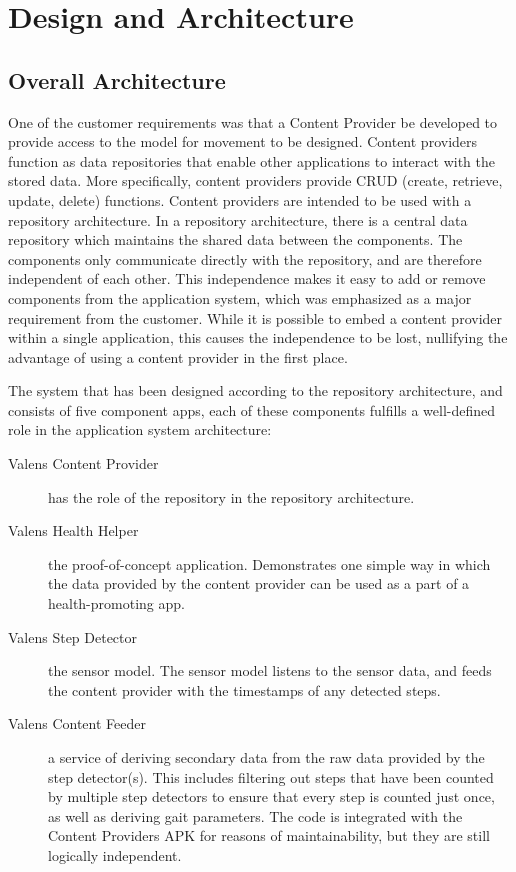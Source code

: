 \chapter{Design and Architecture}


\section{Overall Architecture}
\label{def:CProvider}
One of the customer requirements was that a Content Provider be developed to provide access to the model for movement to be designed. Content providers function as data repositories that enable other applications to interact with the stored data. More specifically, content providers provide CRUD (create, retrieve, update, delete) functions. Content providers are intended to be used with a repository architecture. In a repository architecture, there is a central data repository which maintains the shared data between the components. The components only communicate directly with the repository, and are therefore independent of each other. This independence makes it easy to add or remove components from the application system, which was emphasized as a major requirement from the customer. While it is possible to embed a content provider within a single application, this causes the independence to be lost, nullifying the advantage of using a content provider in the first place.

The system that has been designed according to the repository architecture, and consists of five component apps, each of these components fulfills a well-defined role in the application system architecture:
\begin{description}
\item[Valens Content Provider] has the role of the repository in the repository architecture.
\item[Valens Health Helper] the proof-of-concept application. Demonstrates one simple way in which the data provided by the content provider can be used as a part of a health-promoting app.
\item[Valens Step Detector] the sensor model. The sensor model listens to the sensor data, and feeds the content provider with the timestamps of any detected steps.
\item[Valens Content Feeder] a service of deriving secondary data from the raw data provided by the step detector(s). This includes filtering out steps that have been counted by multiple step detectors to ensure that every step is counted just once, as well as deriving gait parameters. The code is integrated with the Content Providers APK for reasons of maintainability, but they are still logically independent.
\end{description}

